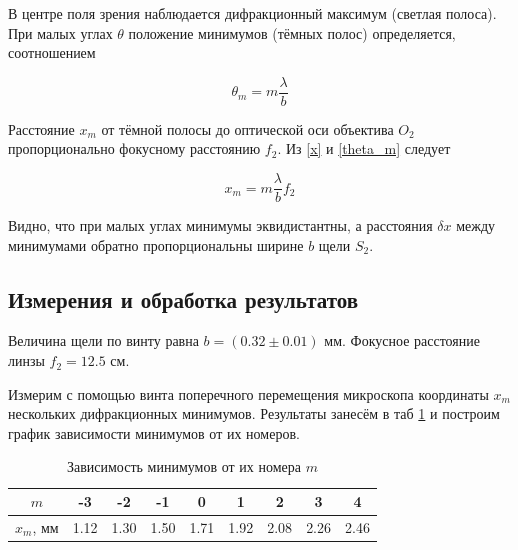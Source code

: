 \documentclass[a4paper,12pt]{article} %
\begin{document}
В центре поля зрения наблюдается дифракционный максимум (светлая полоса). При малых углах $ \theta $ положение минимумов (тёмных полос)
определяется, соотношением

\begin{equation}\label{theta_m}
\theta_m = m \dfrac{\lambda}{b}
\end{equation}

Расстояние $ x_m $ от тёмной полосы до оптической оси объектива $ O_2 $ пропорционально фокусному расстоянию $ f_2 $. Из \eqref{x} и \eqref{theta_m} следует 

\begin{equation}\label{xm}
x_m = m \dfrac{\lambda}{b} f_2
\end{equation}

Видно, что при малых углах минимумы эквидистантны, а расстояния $ \delta x $ между минимумами обратно пропорциональны ширине $ b $ щели $ S_2 $.

\subsection{Измерения и обработка результатов}

Величина щели по винту равна $ b = (0.32\pm0.01)$ мм. Фокусное расстояние линзы $ f_2 = 12.5$ см.

Измерим с помощью винта поперечного перемещения микроскопа координаты $ x_m $ нескольких дифракционных минимумов.
Результаты занесём в таб \ref{tab2} и построим график зависимости минимумов от их номеров. 

\begin{table}[!ht]
	\caption{Зависимость минимумов от их номера $ m $}
	\begin{center}
		\begin{tabular}{|c|c|c|c|c|c|c|c|c|} \hline
			$m$ & -3 & -2 & -1 & 0 & 1 & 2 & 3 & 4\\ \hline
			$ x_m $, мм  & 1.12 & 1.30 & 1.50 & 1.71 & 1.92 & 2.08 & 2.26 & 2.46\\ \hline
		\end{tabular}
	\end{center}
	\label{tab2}
\end{table}


\begin{center}
\end{center}
\end{document}
